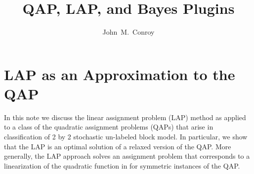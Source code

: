  

\usepackage{amsmath}
\usepackage{amssymb}
\theoremstyle{plain} \newtheorem{Exa}{Example}[section]
\newtheorem{Rem}{Remark}[section]
\newtheorem{Alg}{Algorithm}[section]
\newtheorem{Thm}{Theorem}[section]
\newtheorem{Lem}{Lemma}[section]
\newtheorem{Def}{Definition}[section]
\title{QAP, LAP, and Bayes Plugins}
\author
{John~M.~Conroy}



\maketitle


\renewcommand{\topfraction}{1.0}
\renewcommand{\bottomfraction}{1.0}
\renewcommand{\textfraction}{0.0}


% 



\section{LAP as an Approximation to the QAP}

In this note we discuss the linear assignment problem (LAP) 
method  as applied to a class of the quadratic assignment problems (QAPs) that
arise in classification of 2 by 2 stochastic un-labeled block model. 
In particular, we show that the LAP is an optimal solution of a
relaxed version of the QAP.   More generally, the LAP approach
solves an assignment problem that corresponds to a linearization
of the quadratic function in for symmetric instances of the QAP.

